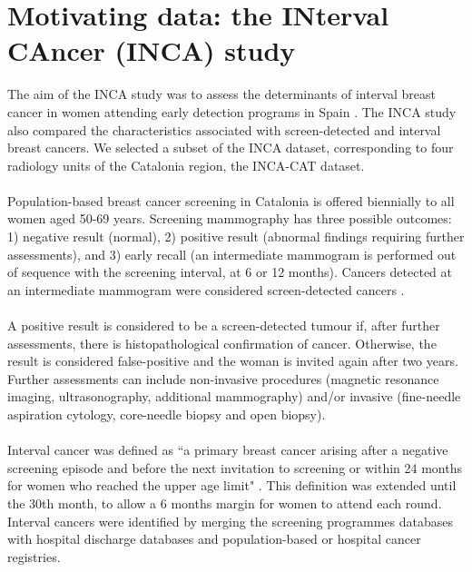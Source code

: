 \section{Motivating data: the INterval CAncer (INCA) study}
The aim of the INCA study was to assess the determinants of interval breast cancer in women
attending early detection programs in Spain \cite{Domingo2014, Blanch2014}. The INCA study also compared the characteristics associated with screen-detected and interval breast cancers. We selected a subset of the INCA dataset, corresponding to four radiology units of the Catalonia region, the INCA-CAT dataset. 

\paragraph{}Population-based breast cancer screening in Catalonia is offered biennially to all
women aged 50-69 years. Screening mammography has three possible outcomes: 1) negative result
(normal), 2) positive result (abnormal findings requiring further assessments), and 3) early recall
(an intermediate mammogram is performed out of sequence with the screening interval, at 6 or 12
months). Cancers detected at an intermediate mammogram were considered screen-detected cancers \cite{Perry2008}.

\paragraph{}A positive result is considered to be a screen-detected tumour if, after further
assessments, there is histopathological confirmation of cancer. Otherwise, the result is considered
false-positive and the woman is invited again after two years. Further assessments can include
non-invasive procedures (magnetic resonance imaging, ultrasonography, additional mammography) and/or
invasive (fine-needle aspiration cytology, core-needle biopsy and open biopsy). 

\paragraph{}Interval cancer was defined as ``a primary breast cancer arising after a negative
screening episode and before the next invitation to screening or within 24 months for women who
reached the upper age limit" \cite{Perry2008}. This definition was extended until the 30th month, to allow a 6 months margin for women to attend each round. Interval cancers were identified by merging the screening programmes databases with hospital discharge databases and population-based or hospital cancer registries. 

